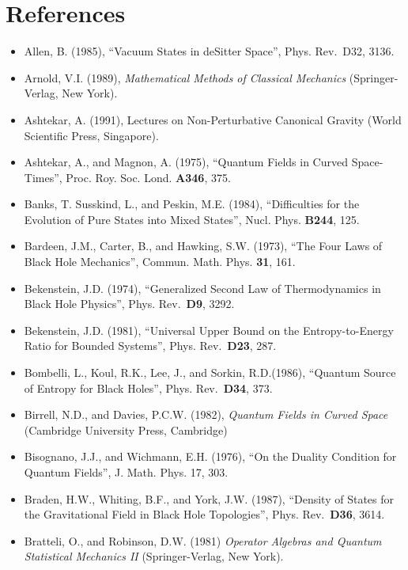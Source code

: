 \documentclass[11pt,a4paper]{article}
\providecommand{\tightlist}{\setlength{\itemsep}{0pt}\setlength{\parskip}{0pt}}
\begin{document}
\clearpage
\hypertarget{source-208}{}
\section*{References}

\begin{itemize}
\tightlist
\item
  Allen, B. (1985), ``Vacuum States in deSitter Space'', Phys. Rev.~D32, 3136.
\item
  Arnold, V.I. (1989), \emph{Mathematical Methods of Classical Mechanics} (Springer-Verlag, New York).
\item
  Ashtekar, A. (1991), Lectures on Non-Perturbative Canonical Gravity (World Scientific Press, Singapore).
\item
  Ashtekar, A., and Magnon, A. (1975), ``Quantum Fields in Curved Space-Times'', Proc. Roy. Soc. Lond. \textbf{A346}, 375.
\item
  Banks, T. Susskind, L., and Peskin, M.E. (1984), ``Difficulties for the Evolution of Pure States into Mixed States'', Nucl. Phys. \textbf{B244}, 125.
\item
  Bardeen, J.M., Carter, B., and Hawking, S.W. (1973), ``The Four Laws of Black Hole Mechanics'', Commun. Math. Phys. \textbf{31}, 161.
\item
  Bekenstein, J.D. (1974), ``Generalized Second Law of Thermodynamics in Black Hole Physics'', Phys. Rev.~\textbf{D9}, 3292.
\item
  Bekenstein, J.D. (1981), ``Universal Upper Bound on the Entropy-to-Energy Ratio for Bounded Systems'', Phys. Rev.~\textbf{D23}, 287.
\item
  Bombelli, L., Koul, R.K., Lee, J., and Sorkin, R.D.(1986), ``Quantum Source of Entropy for Black Holes'', Phys. Rev.~\textbf{D34}, 373.
\item
  Birrell, N.D., and Davies, P.C.W. (1982), \emph{Quantum Fields in Curved Space} (Cambridge University Press, Cambridge)
\item
  Bisognano, J.J., and Wichmann, E.H. (1976), ``On the Duality Condition for Quantum Fields'', J. Math. Phys. 17, 303.
\item
  Braden, H.W., Whiting, B.F., and York, J.W. (1987), ``Density of States for the Gravitational Field in Black Hole Topologies'', Phys. Rev.~\textbf{D36}, 3614.
\item
  Bratteli, O., and Robinson, D.W. (1981) \emph{Operator Algebras and Quantum Statistical Mechanics II} (Springer-Verlag, New York).

\end{itemize}
\end{document}
